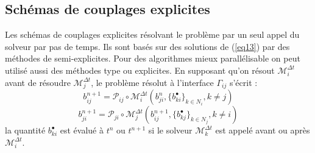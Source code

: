 \documentclass[11pt,a4paper]{scrartcl}%
\begin{document}
	\subsection{Schémas de couplages explicites}\label{sec7}
	Les schémas de couplages explicites résolvant le problème par un seul appel du solveur par pas de temps. Ils sont basés sur des solutions de (\ref{eq13}) par des méthodes de  semi-explicites. Pour des algorithmes mieux parallélisable on peut utilisé aussi des méthodes type  ou explicites. En supposant qu'on résout $\mathcal{M}_i^{\Delta t}$ avant de résoudre $\mathcal{M}_j^{\Delta t}$, le problème résolut à l'interface  $\Gamma_{ij}$ s'écrit :
	\begin{equation}\label{eq19}
	b_{ij}^{n+1} = \mathcal{P}_{ij}\circ\mathcal{M}_i^{\Delta t}\left(b_{ji}^n,\{b_{ki}^\bullet\}_{k\in N_i}, k\neq j \right)
	\end{equation}   
	\begin{equation}\label{eq20}
	b_{ji}^{n+1} = \mathcal{P}_{ji}\circ\mathcal{M}_j^{\Delta t}\left(b_{ij}^{n+1},\{b_{kj}^\bullet\}_{k\in N_j}, k\neq i\right)
	\end{equation}
	la quantité $b_{ki}^\bullet$ est évalué à $t^n$ ou $t^{n+1}$ si le solveur 
	$\mathcal{M}_k^{\Delta t}$ est appelé avant ou après $\mathcal{M}_i^{\Delta t}$.\\
\end{document}
